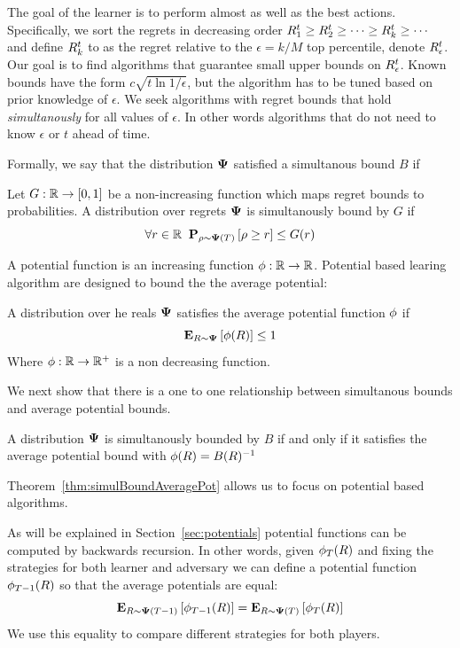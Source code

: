 \documentclass{article}[12pt]
\begin{document}
The goal of the learner is to perform almost as well as the best
actions. Specifically, we sort the regrets in decreasing order $R_1^t \geq
R_2^t \geq \cdots \geq R_k^t \geq \cdots$ and define $R_k^t$ to
as the regret relative to the $\epsilon=k/M$ top percentile, denote $R_\epsilon^t$. Our goal
is to find algorithms that guarantee small upper bounds on
$R_\epsilon^t$. Known bounds have the form $c \sqrt{t \ln
  {1/\epsilon}}$, but the algorithm has to be tuned based on prior
knowledge of $\epsilon$. We seek algorithms with regret bounds that hold {\em simultanously} for all values
of $\epsilon$. In other words algorithms that do not need to know
$\epsilon$ or $t$ ahead of time.

Formally, we say that the distribution ${\bf \Psi}$ satisfied a
simultanous bound $B$ if
\begin{definition} \label{def:unif-regret-bound} Let $G: \mathbb{R} \to [0,1]$ be a
  non-increasing function which maps regret bounds to probabilities.
  A distribution over regrets ${\bf \Psi}$ is simultanously bound by $G$ if
  \[
    \forall r \in \mathbb{R} \;\; {\bf P}_{\rho \sim {\bf \Psi}(T)}\left[ \rho \geq r \right] \leq G(r)
  \]
\end{definition}

A potential function is an increasing function
$\phi:\mathbb{R} \to \mathbb{R}$. Potential based learing algorithm
are designed to bound the the average potential:
\begin{definition} \label{def:aver-potential-bound}
  A distribution over he reals ${\bf \Psi}$ satisfies the average
  potential function $\phi$ if
  $${\bf E}_{R \sim {\bf \Psi}}\left[ \phi(R) \right] \leq 1$$
  Where $\phi: \mathbb{R} \to \mathbb{R}^+$ is a non decreasing function. 
\end{definition}

We next show that there is a one to one relationship between
simultanous bounds and average potential bounds. 
\begin{theorem}\label{thm:simulBoundAveragePot}
 A distribution ${\bf \Psi}$ is simultanously bounded by $B$ if and only
 if it satisfies the average potential bound with $\phi(R) = B(R)^{-1}$
\end{theorem}
Theorem~\ref{thm:simulBoundAveragePot} allows us to focus on potential
based algorithms.

As will be explained in Section~\ref{sec:potentials} potential
functions can be computed by backwards recursion. In other words,
given $\phi_T(R)$ and fixing the strategies for both learner and
adversary we can define a potential function $\phi_{T-1}(R)$ so that
the average potentials are equal:
\[
  {\bf E}_{R \sim {\bf \Psi}(T-1)}\left[ \phi_{T-1}(R) \right] = {\bf E}_{R \sim {\bf \Psi}(T)}\left[ \phi_T(R) \right]
  \]
  We use this equality to compare different strategies for both players.
\end{document}
